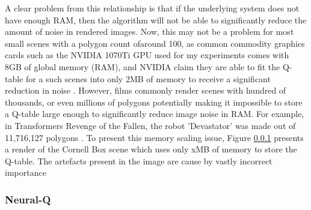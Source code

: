\documentclass[../dissertation.tex]{subfiles}
\begin{document}
A clear problem from this relationship is that if the underlying system does not have enough RAM, then the algorithm will not be able to significantly reduce the amount of noise in rendered images. Now, this may not be a problem for most small scenes with a polygon count ofaround 100, as common commodity graphics cards such as the NVIDIA 1070Ti GPU used for my experiments comes with 8GB of global memory (RAM), and NVIDIA claim they are able to fit the Q-table for a such scenes into only 2MB of memory to receive a significant reduction in noise \cite{dahm2017learning}. However, films commonly render scenes with hundred of thousands, or even millions of polygons potentially making it impossible to store a Q-table large enough to significantly reduce image noise in RAM. For example, in Transformers Revenge of the Fallen, the robot 'Devastator' was made out of 11,716,127 polygons \cite{devastator}. To present this memory scaling issue, Figure \ref{} presents a render of the Cornell Box scene which uses only xMB of memory to store the Q-table. The artefacts present in the image are cause by vastly incorrect importance\\


\subsubsection{Neural-Q}
\end{document}
